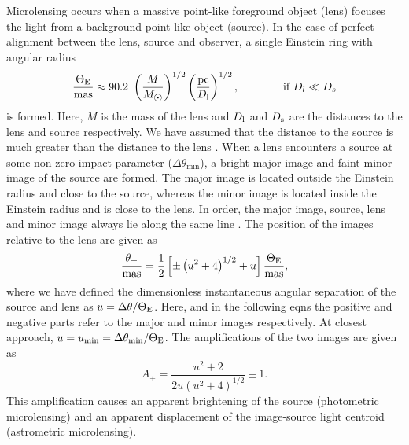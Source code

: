 \documentclass[fleqn,usenatbib]{mnras}
\newcommand{\Dl}{{D_{\rm l}}}
\newcommand{\Ds}{{D_{\rm s}}}
\newcommand{\ThetaE}{{\Theta_{\rm E}}}
\begin{document}
Microlensing occurs when a massive point-like foreground object (lens) focuses the light from a background point-like object (source). In the case of perfect alignment between the lens, source and observer, a single Einstein ring with angular radius     
%
\begin{equation}
		\frac{\ThetaE}{{\rm mas}} \approx 90.2 \text{ } \left(\frac{M}{M_{\sun}}\right)^{1/2}\left(\frac{\text{pc}}{\Dl}\right)^{1/2}, \qquad\qquad \text{if } D_{l} \ll D_{s}
		\label{eq:einstienRadius}
	\end{equation}
%   
is formed. Here, $M$ is the mass of the lens and $\Dl$ and $\Ds$ are the distances to the lens and source respectively. We have assumed that the distance to the source is much greater than the distance to the lens \citep{Paczynski1986}. When a lens encounters a source at some non-zero impact parameter ($\Delta\theta_{\text{min}}$), a bright major image and faint minor image of the source are formed. The major image is located outside the Einstein radius and close to the source, whereas the minor image is located inside the Einstein radius and is close to the lens. In order, the major image, source, lens and minor image always lie along the same line \citep[see][Fig 2.]{Boden1998}. The position of the images relative to the lens are given as~\citep{Paczynski1986}
%
\begin{equation}
\frac{\theta_{\pm}}{\text{mas}} = \frac{1}{2}\left[\pm\left(u^{2}+4\right)^{1/2}+u\right]\frac{\ThetaE}{\text{mas}},
\end{equation}
%
where we have defined the dimensionless instantaneous angular separation of the source and lens as $u=\Delta\theta/\ThetaE$. Here, and in the following eqns the positive and negative parts refer to the major and minor images respectively. At closest approach, $u=u_{\text{min}}=\Delta\theta_{\text{min}}/\ThetaE$. The amplifications of the two images are given as \citep{Paczynski1986}
%
\begin{equation}
A_{\pm} = \frac{u^{2}+2}{2u \left(u^{2}+4\right)^{1/2}}\pm1.
\end{equation}
%
This amplification causes an apparent brightening of the source (photometric microlensing) and an apparent displacement of the image-source light centroid (astrometric microlensing).  
\end{document}
